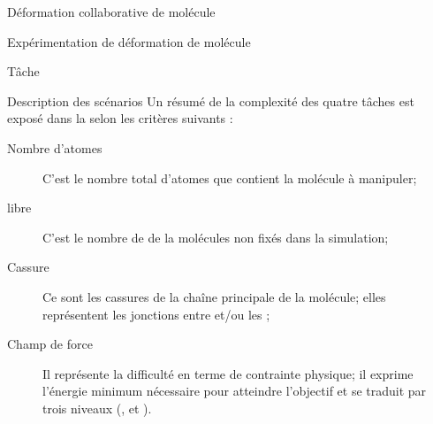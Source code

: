 \documentclass[myfrancais]{mythesis}
\begin{document}
\begin{mychapter}{Déformation collaborative de molécule}
\begin{mysection}{Expérimentation de déformation de molécule}
\begin{mysubsection}{Tâche}
\begin{mysubsubsection}{Description des scénarios}
					Un résumé de la complexité des quatre tâches est exposé dans la  selon les critères suivants :
					\begin{description}
						\item[Nombre d'atomes] C'est le nombre total d'atomes que contient la molécule à manipuler;
						\item[ libre] C'est le nombre de  de la molécules non fixés dans la simulation;
						\item[Cassure] Ce sont les cassures de la chaîne principale de la molécule; elles représentent les jonctions entre \myhelice* et/ou les \myfeuillet*;
						\item[Champ de force] Il représente la difficulté en terme de contrainte physique; il exprime l'énergie minimum nécessaire pour atteindre l'objectif et se traduit par trois niveaux (,  et ).
					\end{description}


\end{mysubsubsection}
\end{mysubsection}
\end{mysection}
\end{mychapter}
\end{document}
